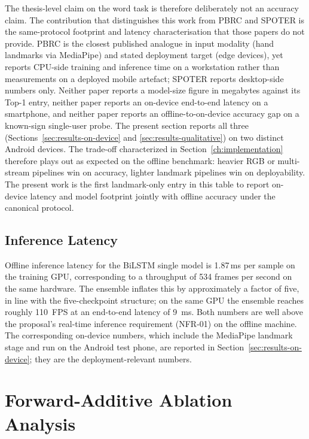 The thesis-level claim on the word task is therefore deliberately
not an accuracy claim. The contribution that distinguishes this
work from PBRC and SPOTER is the same-protocol footprint and
latency characterisation that those papers do not provide. PBRC
is the closest published analogue in input modality (hand
landmarks via MediaPipe) and stated deployment target (edge
devices), yet reports CPU-side training and inference time on a
workstation rather than measurements on a deployed mobile
artefact; SPOTER reports desktop-side numbers only. Neither
paper reports a model-size figure in megabytes against its
Top-1 entry, neither paper reports an on-device end-to-end
latency on a smartphone, and neither paper reports an
offline-to-on-device accuracy gap on a known-sign single-user
probe. The present section reports all three
(Sections~\ref{sec:results-on-device} and
\ref{sec:results-qualitative}) on two distinct Android devices.
The trade-off characterized in Section~\ref{ch:implementation}
therefore plays out as expected on the offline benchmark:
heavier RGB or multi-stream pipelines win on accuracy, lighter
landmark pipelines win on deployability. The present work is the
first landmark-only entry in this table to report on-device
latency and model footprint jointly with offline accuracy under
the canonical protocol.

\subsection{Inference Latency}
\label{sec:results-words-latency}

Offline inference latency for the BiLSTM single model is
1.87\,ms per sample on the training GPU, corresponding to a throughput
of 534 frames per second on the same hardware. The ensemble inflates
this by approximately a factor of five, in line with the
five-checkpoint structure; on the same GPU the ensemble reaches roughly
110~FPS at an end-to-end latency of 9~ms. Both numbers are well above
the proposal's real-time inference requirement (NFR-01) on the offline
machine. The corresponding on-device numbers,
which include the MediaPipe landmark stage and run on the Android test
phone, are reported in Section~\ref{sec:results-on-device}; they are
the deployment-relevant numbers.

\section{Forward-Additive Ablation Analysis}
\label{sec:results-ablation}

